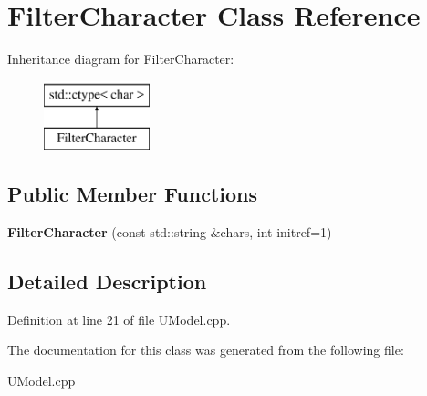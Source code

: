 \hypertarget{classFilterCharacter}{}\section{Filter\+Character Class Reference}
\label{classFilterCharacter}
Inheritance diagram for Filter\+Character\+:\begin{figure}[H]
\begin{center}
\leavevmode
\includegraphics[height=2.000000cm]{db/df5/classFilterCharacter}
\end{center}
\end{figure}
\subsection*{Public Member Functions}
\begin{DoxyCompactItemize}
\item 
\mbox{\label{classFilterCharacter_af68a4d80a5ce027e32bcb1174ed7c822}} 
{\bfseries Filter\+Character} (const std\+::string \&chars, int initref=1)
\end{DoxyCompactItemize}


\subsection{Detailed Description}


Definition at line 21 of file U\+Model.\+cpp.



The documentation for this class was generated from the following file\+:\begin{DoxyCompactItemize}
\item 
U\+Model.\+cpp\end{DoxyCompactItemize}
